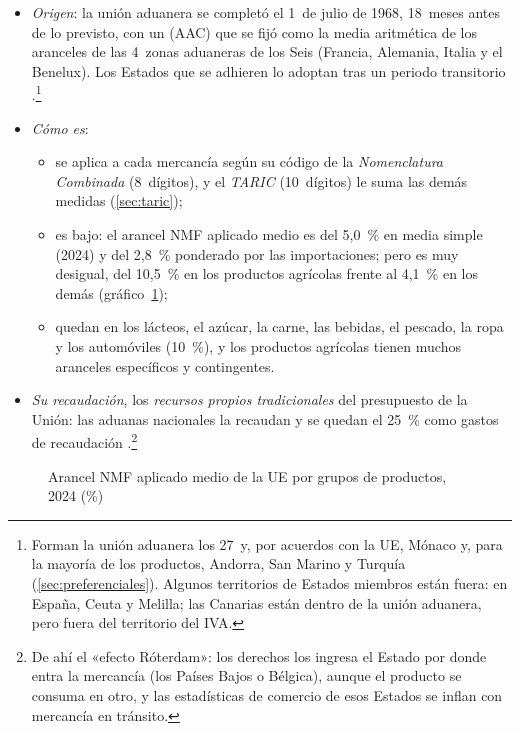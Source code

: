 \documentclass[11pt]{article}
\begin{document}
\begin{itemize}
\item \emph{Origen}: la unión aduanera se completó el 1~de julio de 1968, 18~meses antes de lo previsto, con un  (AAC) que se fijó como la media aritmética de los aranceles de las 4~zonas aduaneras de los Seis (Francia, Alemania, Italia y el Benelux). Los Estados que se adhieren lo adoptan tras un periodo transitorio .\footnote{Forman la unión aduanera los 27~y, por acuerdos con la UE, Mónaco y, para la mayoría de los productos, Andorra, San Marino y Turquía (\ref{sec:preferenciales}). Algunos territorios de Estados miembros están fuera: en España, Ceuta y Melilla; las Canarias están dentro de la unión aduanera, pero fuera del territorio del IVA.}
\item \emph{Cómo es}:
  \begin{itemize}
  \item se aplica a cada mercancía según su código de la \emph{Nomenclatura Combinada} (8~dígitos), y el \emph{TARIC} (10~dígitos) le suma las demás medidas (\ref{sec:taric});
  \item es bajo: el arancel NMF aplicado medio es del 5,0~\% en media simple (2024) y del 2,8~\% ponderado por las importaciones; pero es muy desigual, del 10,5~\% en los productos agrícolas frente al 4,1~\% en los demás (gráfico~\ref{fig:aranceles})\nocite{OMC2025PerfilesArancelarios};
  \item quedan  en los lácteos, el azúcar, la carne, las bebidas, el pescado, la ropa y los automóviles (10~\%), y los productos agrícolas tienen muchos aranceles específicos y contingentes.
  \end{itemize}
\item \emph{Su recaudación}, los \emph{recursos propios tradicionales} del presupuesto de la Unión: las aduanas nacionales la recaudan y se quedan el 25~\% como gastos de recaudación .\footnote{De ahí el «efecto Róterdam»: los derechos los ingresa el Estado por donde entra la mercancía (los Países Bajos o Bélgica), aunque el producto se consuma en otro, y las estadísticas de comercio de esos Estados se inflan con mercancía en tránsito.}
\end{itemize}

\begin{figure}[H]
\centering
\caption{Arancel NMF aplicado medio de la UE por grupos de productos, 2024 (\%)}\label{fig:aranceles}
\end{figure}
\end{document}

